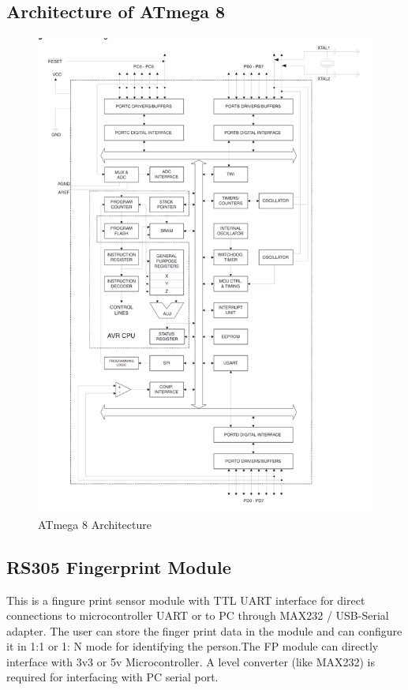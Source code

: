 \documentclass[twoside,a4paper,16pt]{book}
\begin{document}
{\subsection*{Architecture of ATmega 8}
\begin{figure}[ht!]
	\begin{center}
		\includegraphics[width=15.0cm]{10.png}
		\caption{ATmega 8 Architecture}
	\end{center}
\end{figure}
\subsection{RS305 Fingerprint Module }
This is a fingure print sensor module with TTL UART interface for direct connections to microcontroller UART or to PC through MAX232 / USB-Serial adapter. The user can store the finger print data in the module and can configure it in 1:1 or 1: N mode for identifying the person.The FP module can directly interface with 3v3 or 5v Microcontroller. A level converter (like MAX232) is required for interfacing with PC serial port.

}
\end{document}

